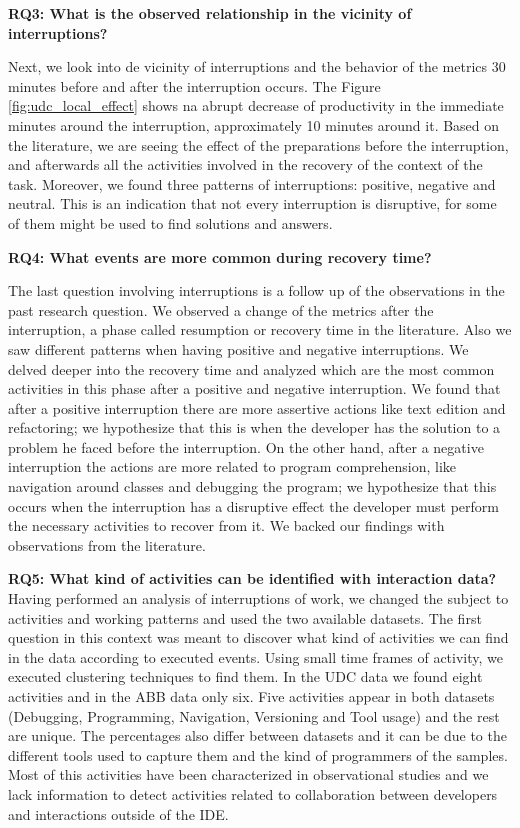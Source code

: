 \textbf{RQ3: What is the observed relationship in the vicinity of interruptions?}

Next, we look into de vicinity of interruptions and the behavior of the metrics 30 minutes before and after the interruption occurs. The Figure \ref{fig:udc_local_effect} shows na abrupt decrease of productivity in the immediate minutes around the interruption, approximately 10 minutes around it. Based on the literature, we are seeing the effect of the preparations before the interruption, and afterwards all the activities involved in the recovery of the context of the task. Moreover, we found three patterns of interruptions: positive, negative and neutral. This is an indication that not every interruption is disruptive, for some of them might be used to find solutions and answers.

\textbf{RQ4: What events are more common during recovery time?}

The last question involving interruptions is a follow up of the observations in the past research question. We observed a change of the metrics after the interruption, a phase called resumption or recovery time in the literature. Also we saw different patterns when having positive and negative interruptions. We delved deeper into the recovery time and analyzed which are the most common activities in this phase after a positive and negative interruption. We found that after a positive interruption there are more assertive actions like text edition and refactoring; we hypothesize that this is when the developer has the solution to a problem he faced before the interruption. On the other hand, after a negative interruption the actions are more related to program comprehension, like navigation around classes and debugging the program; we hypothesize that this occurs when the interruption has a disruptive effect the developer must perform the necessary activities to recover from it. We backed our findings with observations from the literature.

\textbf{RQ5: What kind of activities can be identified with interaction data?}
Having performed an analysis of interruptions of work, we changed the subject to activities and working patterns and used the two available datasets. The first question in this context was meant to discover what kind of activities we can find in the data according to executed events. Using small time frames of activity, we executed clustering techniques to find them. In the UDC data we found eight activities and in the ABB data only six. Five activities appear in both datasets (Debugging, Programming, Navigation, Versioning and Tool usage) and the rest are unique. The percentages also differ between datasets and it can be due to the different tools used to capture them and the kind of programmers of the samples. Most of this activities have been characterized in observational studies and we lack information to detect activities related to collaboration between developers and interactions outside of the IDE.

